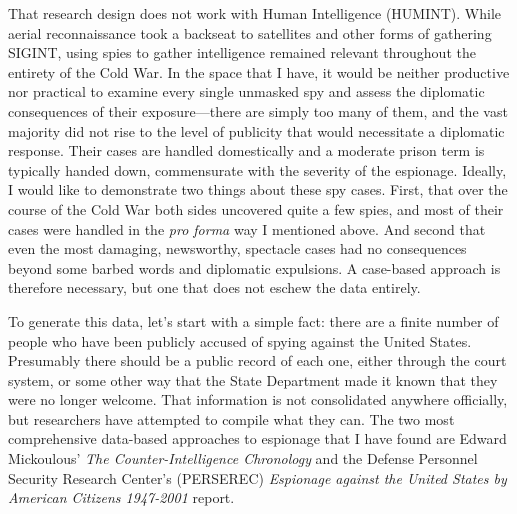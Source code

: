 \documentclass{report}
\begin{document}
\begin{refsegment}

That research design does not work with Human Intelligence (HUMINT). While aerial reconnaissance took a backseat to satellites and other forms of gathering SIGINT, using spies to gather intelligence remained relevant throughout the entirety of the Cold War. In the space that I have, it would be neither productive nor practical to examine every single unmasked spy and assess the diplomatic consequences of their exposure---there are simply too many of them, and the vast majority did not rise to the level of publicity that would necessitate a diplomatic response. Their cases are handled domestically and a moderate prison term is typically handed down, commensurate with the severity of the espionage. Ideally, I would like to demonstrate two things about these spy cases. First, that over the course of the Cold War both sides uncovered quite a few spies, and most of their cases were handled in the \emph{pro forma} way I mentioned above. And second that even the most damaging, newsworthy, spectacle cases had no consequences beyond some barbed words and diplomatic expulsions. A case-based approach is therefore necessary, but one that does not eschew the data entirely.


To generate this data, let's start with a simple fact: there are a finite number of people who have been publicly accused of spying against the United States. Presumably there should be a public record of each one, either through the court system, or some other way that the State Department made it known that they were no longer welcome. That information is not consolidated anywhere officially, but researchers have attempted to compile what they can. The two most comprehensive data-based approaches to espionage that I have found are Edward Mickoulous' \emph{The Counter-Intelligence Chronology} and the Defense Personnel Security Research Center's (PERSEREC) \emph{Espionage against the United States by American Citizens 1947-2001} report.


\end{refsegment}
\end{document}
